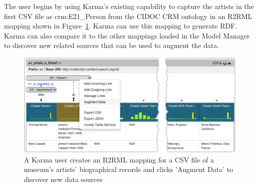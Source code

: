 The user begins by using Karma's existing capability to capture the artists in the first CSV file as crm:E21\_Person from the CIDOC CRM ontology in an R2RML mapping shown in Figure~\ref{fig:simple-model-screenshot}.  
Karma can use this mapping to generate RDF. 
Karma can also compare it to the other mappings loaded in the Model Manager to discover new related sources that can be used to augment the data.
\begin{figure}[bh]
\centering
\includegraphics[width=4.8in]{images/4-simple-model.png}
\vspace{-20pt}
\caption{A Karma user creates an R2RML mapping for a CSV file of a museum's artists' biographical records and clicks 'Augment Data' to discover new data sources}
\vspace{-21pt}
\label{fig:simple-model-screenshot}
\end{figure}
